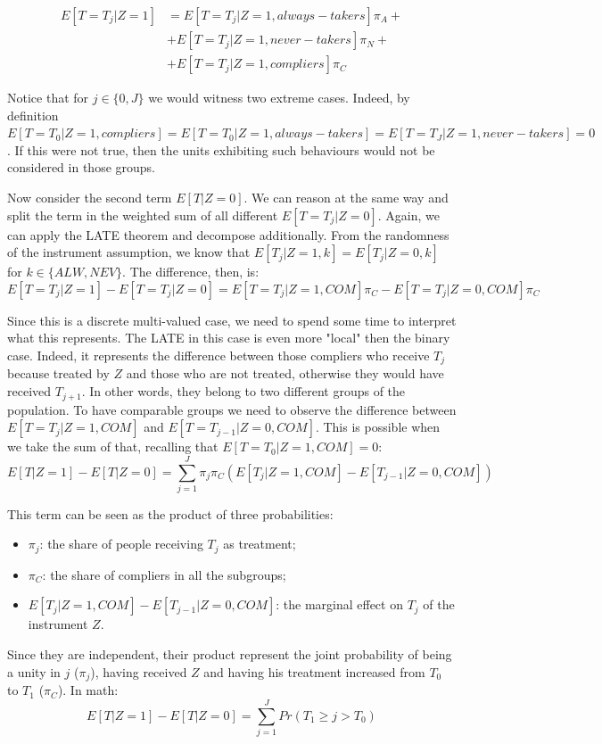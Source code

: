 \documentclass[a4paper,12pt,oneside,English]{article}
\begin{document}
\[
\begin{split}
E[T=T_j|Z=1]&=E[T=T_j|Z=1, always-takers]\pi_A+\\&+E[T=T_j|Z=1, never-takers]\pi_N+\\&+E[T=T_j|Z=1, compliers]\pi_C
\end{split}
\]

Notice that for $j\in\{0,J\}$ we would witness two extreme cases. Indeed, by definition $E[T=T_0|Z=1, compliers]=E[T=T_0|Z=1, always-takers]=E[T=T_J|Z=1, never-takers]=0$. If this were not true, then the units exhibiting such behaviours would not be considered in those groups.

Now consider the second term $E[T|Z=0]$. We can reason at the same way and split the term in the weighted sum of all different $E[T=T_j|Z=0]$. Again, we can apply the LATE theorem and decompose additionally. From the randomness of the instrument assumption, we know that $E[T_j|Z=1, k]=E[T_j|Z=0, k]$ for $k\in\{ALW,NEV\}$. The difference, then, is:
\[
E[T=T_j|Z=1]-E[T=T_j|Z=0]=E[T=T_j|Z=1, COM]\pi_C-E[T=T_j|Z=0, COM]\pi_C
\]

Since this is a discrete multi-valued case, we need to spend some time to interpret what this represents. The LATE in this case is even more "local" then the binary case. Indeed, it represents the difference between those compliers who receive $T_j$ because treated by $Z$ and those who are not treated, otherwise they would have received $T_{j+1}$. In other words, they belong to two different groups of the population. To have comparable groups we need to observe the difference between $E[T=T_j|Z=1, COM]$ and $E[T=T_{j-1}|Z=0, COM]$. This is possible when we take the sum of that, recalling that $E[T=T_0|Z=1, COM]=0$:
\[
E[T|Z=1]-E[T|Z=0]=\sum_{j=1}^J \pi_j \pi_C(E[T_j|Z=1, COM]-E[T_{j-1}|Z=0, COM])
\]

This term can be seen as the product of three probabilities:
\begin{itemize}
    \item $\pi_j$: the share of people receiving $T_j$ as treatment;
    \item $\pi_C$: the share of compliers in all the subgroups;
    \item $E[T_j|Z=1, COM]-E[T_{j-1}|Z=0, COM]$: the marginal effect on $T_j$ of the instrument $Z$.
\end{itemize}

Since they are independent, their product represent the joint probability of being a unity in $j$ ($\pi_j$), having received $Z$ and having his treatment increased from $T_0$ to $T_1$ ($\pi_C$). In math:
\begin{equation}
E[T|Z=1]-E[T|Z=0]=\sum_{j=1}^J Pr(T_1\geq j>T_0) 
\label{eq2}    
\end{equation}
\end{document}

